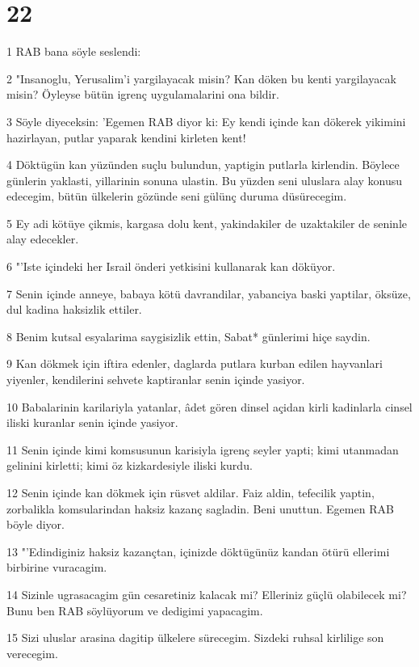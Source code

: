 \chapter{22}

\par 1 RAB bana söyle seslendi:
\par 2 "Insanoglu, Yerusalim'i yargilayacak misin? Kan döken bu kenti yargilayacak misin? Öyleyse bütün igrenç uygulamalarini ona bildir.
\par 3 Söyle diyeceksin: 'Egemen RAB diyor ki: Ey kendi içinde kan dökerek yikimini hazirlayan, putlar yaparak kendini kirleten kent!
\par 4 Döktügün kan yüzünden suçlu bulundun, yaptigin putlarla kirlendin. Böylece günlerin yaklasti, yillarinin sonuna ulastin. Bu yüzden seni uluslara alay konusu edecegim, bütün ülkelerin gözünde seni gülünç duruma düsürecegim.
\par 5 Ey adi kötüye çikmis, kargasa dolu kent, yakindakiler de uzaktakiler de seninle alay edecekler.
\par 6 "'Iste içindeki her Israil önderi yetkisini kullanarak kan döküyor.
\par 7 Senin içinde anneye, babaya kötü davrandilar, yabanciya baski yaptilar, öksüze, dul kadina haksizlik ettiler.
\par 8 Benim kutsal esyalarima saygisizlik ettin, Sabat* günlerimi hiçe saydin.
\par 9 Kan dökmek için iftira edenler, daglarda putlara kurban edilen hayvanlari yiyenler, kendilerini sehvete kaptiranlar senin içinde yasiyor.
\par 10 Babalarinin karilariyla yatanlar, âdet gören dinsel açidan kirli kadinlarla cinsel iliski kuranlar senin içinde yasiyor.
\par 11 Senin içinde kimi komsusunun karisiyla igrenç seyler yapti; kimi utanmadan gelinini kirletti; kimi öz kizkardesiyle iliski kurdu.
\par 12 Senin içinde kan dökmek için rüsvet aldilar. Faiz aldin, tefecilik yaptin, zorbalikla komsularindan haksiz kazanç sagladin. Beni unuttun. Egemen RAB böyle diyor.
\par 13 "'Edindiginiz haksiz kazançtan, içinizde döktügünüz kandan ötürü ellerimi birbirine vuracagim.
\par 14 Sizinle ugrasacagim gün cesaretiniz kalacak mi? Elleriniz güçlü olabilecek mi? Bunu ben RAB söylüyorum ve dedigimi yapacagim.
\par 15 Sizi uluslar arasina dagitip ülkelere sürecegim. Sizdeki ruhsal kirlilige son verecegim.
